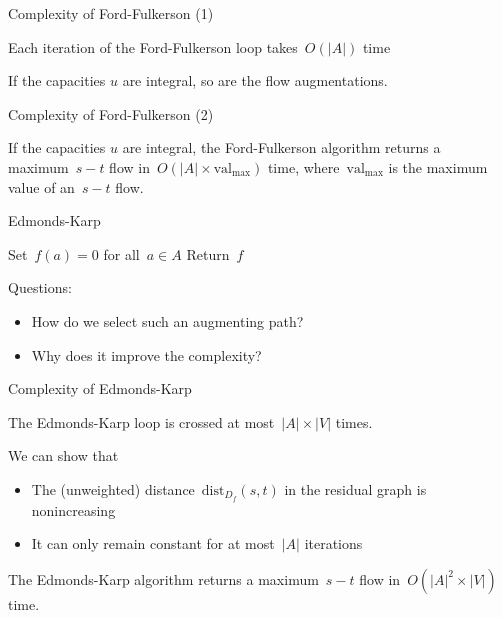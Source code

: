 \documentclass{beamer}
\newcommand{\val}{\mathrm{val}}
\begin{document}
\begin{frame}[t]{Complexity of Ford-Fulkerson (1)} \pause
  \begin{proposition}
    Each iteration of the Ford-Fulkerson loop takes~$O(|A|)$ time
  \end{proposition}
  \vfill \pause
  \begin{proposition}
    If the capacities $u$ are integral, so are the flow augmentations.
  \end{proposition}
  \vfill
\end{frame}

\begin{frame}[t]{Complexity of Ford-Fulkerson (2)} \pause
  \begin{theorem}
     If the capacities $u$ are integral, the Ford-Fulkerson algorithm returns a maximum~$s-t$ flow in~$O(|A| \times \val_{\max})$ time, where~$\val_{\max}$ is the maximum value of an~$s-t$ flow.
  \end{theorem}
\end{frame}

\begin{frame}[t]{Edmonds-Karp}
  \setcounter{algocf}{4}
  \begin{algorithm}[H]
        \caption{Edmonds-Karp algorithm}
   \SetAlgoLined \pause
    \pause
   Set~$f(a) = 0$ for all~$a \in A$\; \pause
    \pause
   Return~$f$
  \end{algorithm}
  \vfill \pause
  Questions: \pause
  \begin{itemize}
    \item How do we select such an augmenting path? \pause
    \item Why does it improve the complexity?
  \end{itemize}
\end{frame}

\begin{frame}{Complexity of Edmonds-Karp} \pause
  \begin{proposition}
    The Edmonds-Karp loop is crossed at most~$|A| \times |V|$ times.
  \end{proposition}  \pause
   We can show that
    \begin{itemize}
      \item The (unweighted) distance~$\mathrm{dist}_{D_f}(s, t)$ in the residual graph is nonincreasing
      \item It can only remain constant for at most~$|A|$ iterations
    \end{itemize}
    \pause
  \begin{theorem}
     The Edmonds-Karp algorithm returns a maximum~$s-t$ flow in~$O(|A|^2 \times |V|)$ time.
  \end{theorem}
\end{frame}
\end{document}
